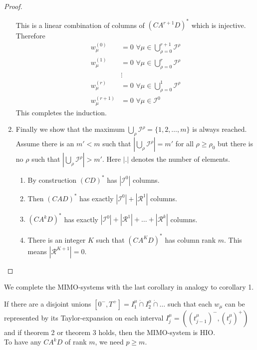 \begin{proof}
\begin{enumerate}
\begin{equation}
			\end{equation}
			This is a linear combination of columns of $(CA^{r+1}D)^*$ which is injective. 
			Therefore
			\begin{align*}
			w_\mu^{(0)} &= 0 \,\,
			\forall \mu \in \bigcup\limits_{\rho =0}^{r+1} \mathcal{I}^\rho  \\
			w_\mu^{(1)} &= 0 \, \,
			\forall \mu \in \bigcup\limits_{\rho =0}^{r} \mathcal{I}^\rho 
			\\	
			&\vdots
			 \\
			w_\mu^{(r)} & = 0 \, \,
			\forall \mu \in  \bigcup\limits_{\rho =0}^{1} \mathcal{I}^\rho \\
			w_\mu^{(r+1)} & = 0 \, \,
			\forall \mu \in  \mathcal{I}^0 
			\end{align*}				
			This completes the induction.
	\item	Finally we show that the maximum $\bigcup_\rho \mathcal{I}^\rho = \{1,2,
			\ldots,m\}$ is always reached.  \\
			Assume there is an $m'<m$ such that $|\bigcup_\rho \mathcal{I}^\rho| = m'$ for 
			all $\rho \geq \rho_0$ but there is no $\rho$ such that $|\bigcup_\rho 
			\mathcal{I}^\rho| > m'$. Here $|.|$ denotes the number of elements. 
			\begin{enumerate}
			\item	By construction $(CD)^*$ has $|\mathcal{I}^0|$ columns.
			\item 	Then $(CAD)^*$ has exactly $|\mathcal{I}^0| + |\mathcal{R}^1|$ columns.
			\item  $(CA^{k}D)^*$ has exactly $|\mathcal{I}^0| + |\mathcal{R}^1|+\ldots 
			+ |\mathcal{R}^k|$ columns.
			\item 	There is an integer $K$ such that $(CA^KD)^*$ has column rank $m$. 
					This means $|\mathcal{R}^{K+1}|=0$.
			\end{enumerate}
			
	\end{enumerate}		

\end{proof}






We complete the MIMO-systems with the last corollary in analogy to corollary 1.
\begin{corollary}{}{}
	If there are a disjoint unions $[0^-,T^+]=I^\mu_1\dot{\cap} I_2^\mu\dot{\cap}\ldots$ 
	such that each $w_\mu$ can be represented by its Taylor-expansion on 
	each interval $I_j^\mu=((t_{j-1}^\mu)^- ,(t_j^\mu)^+)$ and if theorem 2 or theorem 3 
	holds, then the MIMO-system is HIO. \\
	
	To have any $CA^kD$ of rank $m$, we need $p\geq m$.
\end{corollary}

